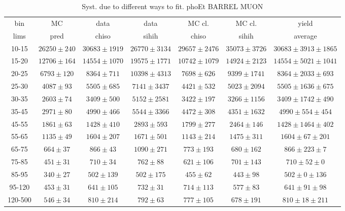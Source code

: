 \begin{table}[h]
  \tiny
  \begin{center}
  \caption{Syst. due to different ways to fit. phoEt BARREL MUON}
  \begin{tabular}{|c|c|c|c|c|c|c|}
    bin &  MC   & data  & data  & MC cl. & MC cl. & yield\\ 
    lims & pred & chiso & sihih & chiso  & sihih  & average \\ \hline
    10-15 & $26250\pm240$ & $30683\pm1919$ & $26770\pm3134$ & $29657\pm2476$ & $35073\pm3726$ &$30683\pm3913\pm1865$  \\ \hline
    15-20 & $12706\pm164$ & $14554\pm1070$ & $19575\pm1771$ & $10742\pm1079$ & $14924\pm2123$ &$14554\pm5021\pm1041$  \\ \hline
    20-25 & $6793\pm120$ & $8364\pm711$ & $10398\pm4313$ & $7698\pm626$ & $9399\pm1741$ &$8364\pm2033\pm693$  \\ \hline
    25-30 & $4087\pm93$ & $5505\pm685$ & $7141\pm3437$ & $4421\pm532$ & $5023\pm2094$ &$5505\pm1636\pm675$  \\ \hline
    30-35 & $2603\pm74$ & $3409\pm500$ & $5152\pm2581$ & $3422\pm197$ & $3266\pm1156$ &$3409\pm1742\pm490$  \\ \hline
    35-45 & $2971\pm80$ & $4990\pm466$ & $5544\pm3366$ & $4472\pm308$ & $4351\pm1632$ &$4990\pm554\pm454$  \\ \hline
    45-55 & $1861\pm63$ & $1428\pm410$ & $2893\pm593$ & $1799\pm277$ & $2464\pm146$ &$1428\pm1464\pm402$  \\ \hline
    55-65 & $1135\pm49$ & $1604\pm207$ & $1671\pm501$ & $1143\pm214$ & $1475\pm311$ &$1604\pm67\pm201$  \\ \hline
    65-75 & $664\pm37$ & $866\pm43$ & $1090\pm271$ & $773\pm193$ & $680\pm162$ &$866\pm223\pm7$  \\ \hline
    75-85 & $451\pm31$ & $710\pm34$ & $762\pm88$ & $621\pm106$ & $701\pm143$ &$710\pm52\pm0$  \\ \hline
    85-95 & $340\pm27$ & $502\pm139$ & $502\pm175$ & $455\pm62$ & $443\pm98$ &$502\pm0\pm136$  \\ \hline
    95-120 & $453\pm31$ & $641\pm105$ & $732\pm31$ & $714\pm113$ & $577\pm83$ &$641\pm91\pm98$  \\ \hline
    120-500 & $546\pm34$ & $810\pm214$ & $792\pm63$ & $777\pm105$ & $678\pm191$ &$810\pm18\pm211$  \\ \hline
  \end{tabular}
  \label{tab:diff_ways_to_fit_phoEt_BARREL_muon}
  \end{center}
\end{table}

